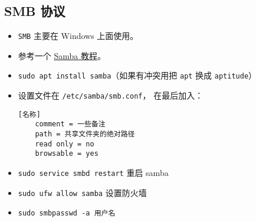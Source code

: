 \subsection{SMB 协议}
\begin{itemize}
\item \verb|SMB| 主要在 Windows 上面使用。
\item 参考一个 \href{https://ubuntu.com/tutorials/install-and-configure-samba}{Samba 教程}。
\item \verb|sudo apt install samba|（如果有冲突用把 \verb|apt| 换成 \verb|aptitude|）
\item 设置文件在 \verb|/etc/samba/smb.conf|， 在最后加入：
\begin{lstlisting}[language=none]
[名称]
    comment = 一些备注
    path = 共享文件夹的绝对路径
    read only = no
    browsable = yes
\end{lstlisting}
\item \verb|sudo service smbd restart| 重启 samba
\item \verb|sudo ufw allow samba| 设置防火墙
\item \verb|sudo smbpasswd -a 用户名|
\end{itemize}
